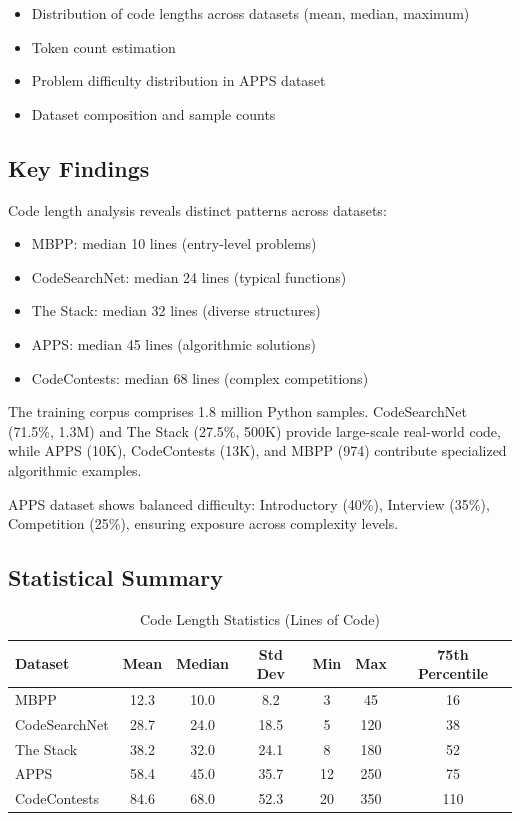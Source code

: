 \documentclass[preprint,12pt]{elsarticle}
\begin{document}
\begin{itemize}
    \item Distribution of code lengths across datasets (mean, median, maximum)
    \item Token count estimation
    \item Problem difficulty distribution in APPS dataset
    \item Dataset composition and sample counts
\end{itemize}

\subsection{Key Findings}

Code length analysis reveals distinct patterns across datasets:
\begin{itemize}
\item MBPP: median 10 lines (entry-level problems)
\item CodeSearchNet: median 24 lines (typical functions)
\item The Stack: median 32 lines (diverse structures)
\item APPS: median 45 lines (algorithmic solutions)
\item CodeContests: median 68 lines (complex competitions)
\end{itemize}

The training corpus comprises 1.8 million Python samples. CodeSearchNet (71.5\%, 1.3M) and The Stack (27.5\%, 500K) provide large-scale real-world code, while APPS (10K), CodeContests (13K), and MBPP (974) contribute specialized algorithmic examples.

APPS dataset shows balanced difficulty: Introductory (40\%), Interview (35\%), Competition (25\%), ensuring exposure across complexity levels.

\subsection{Statistical Summary}

\begin{table}[h]
\centering
\caption{Code Length Statistics (Lines of Code)}
\label{tab:stats_summary}
\small
\begin{tabular}{lcccccc}
\hline
\textbf{Dataset} & \textbf{Mean} & \textbf{Median} & \textbf{Std Dev} & \textbf{Min} & \textbf{Max} & \textbf{75th Percentile} \\
\hline
MBPP & 12.3 & 10.0 & 8.2 & 3 & 45 & 16 \\
CodeSearchNet & 28.7 & 24.0 & 18.5 & 5 & 120 & 38 \\
The Stack & 38.2 & 32.0 & 24.1 & 8 & 180 & 52 \\
APPS & 58.4 & 45.0 & 35.7 & 12 & 250 & 75 \\
CodeContests & 84.6 & 68.0 & 52.3 & 20 & 350 & 110 \\
\hline
\end{tabular}
\end{table}
\end{document}
